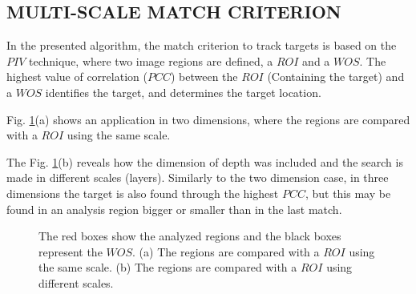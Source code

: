 
\subsection{MULTI-SCALE MATCH CRITERION}
In the presented algorithm, the match criterion to track targets is based on the $PIV$ technique, 
where two image regions are defined, a $ROI$ and a $WOS$. 
The highest value of correlation ($PCC$) between the $ROI$ (Containing the target) and a $WOS$  
identifies the target, and determines the target location.

Fig. \ref{fig:multires}(a) shows an application in two dimensions, where
the regions are compared with a $ROI$ using the same scale.

The Fig. \ref{fig:multires}(b) reveals how the dimension of depth was included and
the search is made in different scales (layers). Similarly to the two dimension case, 
in three dimensions the target is also found through the highest $PCC$, but this may be
found in an analysis region bigger or smaller than in the last match.

\begin{figure}[H]
\centering
  \caption{The red boxes show the analyzed regions and the black boxes represent the $WOS$. 
  (a) The regions are compared with a $ROI$ using the same scale. 
  (b) The regions are compared with a $ROI$ using different scales.}
  \label{fig:multires}
\end{figure}




